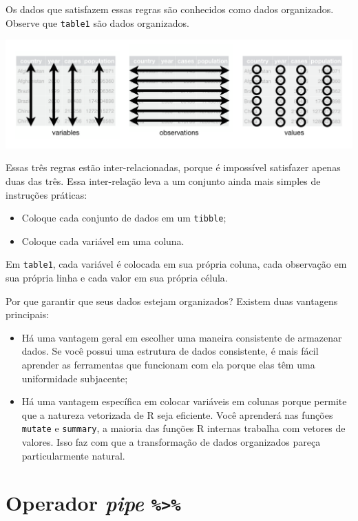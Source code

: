 \documentclass[a4paper]{book}
\begin{document}
Os dados que satisfazem essas regras são conhecidos como dados organizados. Observe que \texttt{table1} são dados organizados.

\begin{center}\includegraphics[width=0.9\linewidth]{imagens/tidy-1} \end{center}

Essas três regras estão inter-relacionadas, porque é impossível satisfazer apenas duas das três. Essa inter-relação leva a um conjunto ainda mais simples de instruções práticas:

\begin{itemize}
\item
  Coloque cada conjunto de dados em um \texttt{tibble};
\item
  Coloque cada variável em uma coluna.
\end{itemize}

Em \texttt{table1}, cada variável é colocada em sua própria coluna, cada observação em sua própria linha e cada valor em sua própria célula.

Por que garantir que seus dados estejam organizados? Existem duas vantagens principais:

\begin{itemize}
\item
  Há uma vantagem geral em escolher uma maneira consistente de armazenar dados. Se você possui uma estrutura de dados consistente, é mais fácil aprender as ferramentas que funcionam com ela porque elas têm uma uniformidade subjacente;
\item
  Há uma vantagem específica em colocar variáveis em colunas porque permite que a natureza vetorizada de R seja eficiente. Você aprenderá nas funções \texttt{mutate} e \texttt{summary}, a maioria das funções R internas trabalha com vetores de valores. Isso faz com que a transformação de dados organizados pareça particularmente natural.
\end{itemize}

\hypertarget{operador-pipe}{%
\section{\texorpdfstring{Operador \emph{pipe} \texttt{\%\textgreater{}\%}}{Operador pipe \%\textgreater\%}}\label{operador-pipe}}
\end{document}
